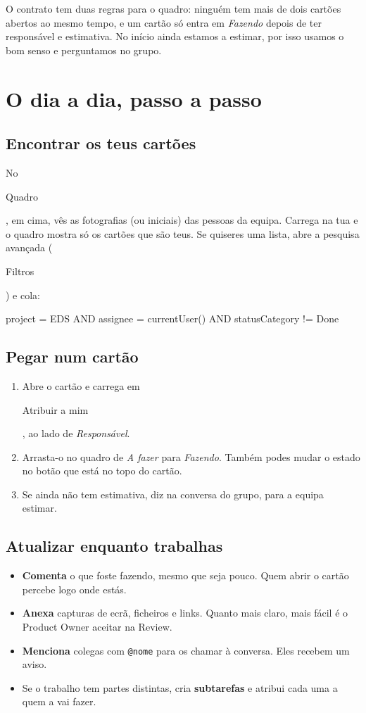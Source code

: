 \documentclass[11pt,a4paper]{article}
\newcommand{\btn}[1]{{\setlength{\fboxsep}{1.6pt}\colorbox{azulclaro}{\sffamily\small\strut #1}}}
\begin{document}
O contrato tem duas regras para o quadro: ninguém tem mais de dois cartões abertos ao mesmo tempo, e um cartão só entra em \textit{Fazendo} depois de ter responsável e estimativa. No início ainda estamos a estimar, por isso usamos o bom senso e perguntamos no grupo.

\section{O dia a dia, passo a passo}

\subsection{Encontrar os teus cartões}

No \btn{Quadro}, em cima, vês as fotografias (ou iniciais) das pessoas da equipa. Carrega na tua e o quadro mostra só os cartões que são teus. Se quiseres uma lista, abre a pesquisa avançada (\btn{Filtros}) e cola:

\begin{codigo}
project = EDS AND assignee = currentUser() AND statusCategory != Done
\end{codigo}

\subsection{Pegar num cartão}

\begin{enumerate}
  \item Abre o cartão e carrega em \btn{Atribuir a mim}, ao lado de \textit{Responsável}.
  \item Arrasta-o no quadro de \textit{A fazer} para \textit{Fazendo}. Também podes mudar o estado no botão que está no topo do cartão.
  \item Se ainda não tem estimativa, diz na conversa do grupo, para a equipa estimar.
\end{enumerate}

\subsection{Atualizar enquanto trabalhas}

\begin{itemize}
  \item \textbf{Comenta} o que foste fazendo, mesmo que seja pouco. Quem abrir o cartão percebe logo onde estás.
  \item \textbf{Anexa} capturas de ecrã, ficheiros e links. Quanto mais claro, mais fácil é o Product Owner aceitar na Review.
  \item \textbf{Menciona} colegas com \texttt{@nome} para os chamar à conversa. Eles recebem um aviso.
  \item Se o trabalho tem partes distintas, cria \textbf{subtarefas} e atribui cada uma a quem a vai fazer.
\end{itemize}
\end{document}
